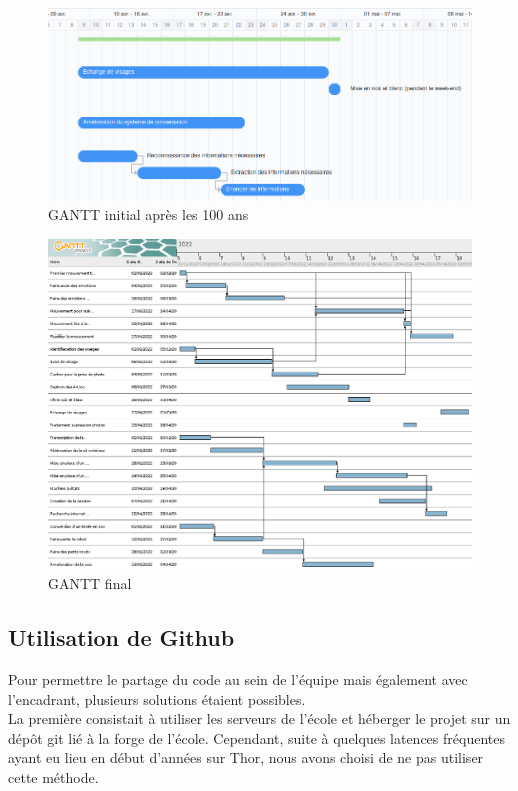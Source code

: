 \documentclass[a4paper,french]{article}
\begin{document}
\begin{figure}[H]
    \centering
    \includegraphics[scale=0.5]{figures/gantt_apres_100_ans.png}
    \caption{GANTT initial après les 100 ans}
\end{figure}

\begin{figure}[H]
    \centering
    \includegraphics[scale=0.38]{figures/gantt_fin_PFA.png}
    \caption{GANTT final}
\end{figure}

\subsection{Utilisation de Github}
Pour permettre le partage du code au sein de l'équipe mais également avec l'encadrant, plusieurs solutions étaient possibles. \\

La première consistait à utiliser les serveurs de l'école et héberger le projet sur un dépôt git lié à la forge de l'école. Cependant, suite à quelques latences fréquentes ayant eu lieu en début d'années sur Thor, nous avons choisi de ne pas utiliser cette méthode. \\
\end{document}
